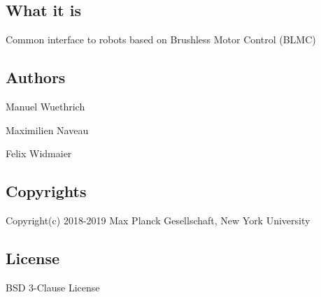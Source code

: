 \subsection*{What it is}

Common interface to robots based on Brushless Motor Control (B\+L\+MC)

\subsection*{Authors}


\begin{DoxyItemize}
\item Manuel Wuethrich
\item Maximilien Naveau
\item Felix Widmaier
\end{DoxyItemize}

\subsection*{Copyrights}

Copyright(c) 2018-\/2019 Max Planck Gesellschaft, New York University

\subsection*{License}

B\+SD 3-\/\+Clause License 